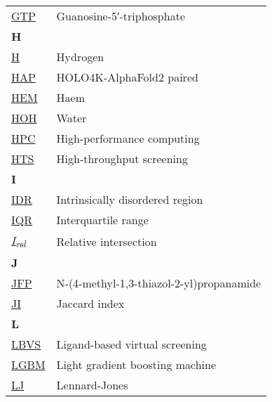 \begin{longtable}[l]{@{}p{2.5cm}p{12cm}@{}}
\textmd{\href{https://www.ebi.ac.uk/pdbe-srv/pdbechem/chemicalCompound/show/GTP}{GTP}} & Guanosine-5′-triphosphate \\[0.3175cm]
\textbf{\large H} & \\[0.25cm]
\textmd{\href{https://en.wikipedia.org/wiki/Hydrogen}{H}} & Hydrogen \\
\textmd{\href{https://jcheminf.biomedcentral.com/articles/10.1186/s13321-024-00821-4}{HAP}} & HOLO4K-AlphaFold2 paired \\
\textmd{\href{https://www.ebi.ac.uk/pdbe-srv/pdbechem/chemicalCompound/show/HEM}{HEM}} & Haem \\
\textmd{\href{https://www.ebi.ac.uk/pdbe-srv/pdbechem/chemicalCompound/show/HOH}{HOH}} & Water \\
\textmd{\href{https://en.wikipedia.org/wiki/High-performance_computing}{HPC}} & High-performance computing \\
\textmd{\href{https://en.wikipedia.org/wiki/High-throughput_screening}{HTS}} & High-throughput screening \\[0.3175cm]
\textbf{\large I} & \\[0.25cm]
\textmd{\href{https://en.wikipedia.org/wiki/Intrinsically_disordered_proteins}{IDR}} & Intrinsically disordered region \\
\textmd{\href{https://en.wikipedia.org/wiki/Interquartile_range}{IQR}} & Interquartile range \\
\textmd{\href{https://www.nature.com/articles/s42003-024-05970-8}{\textit{I\textsubscript{rel}}}} & Relative intersection \\[0.3175cm]
\textbf{\large J} & \\[0.25cm]
\textmd{\href{https://www.ebi.ac.uk/pdbe-srv/pdbechem/chemicalCompound/show/JFP}{JFP}} & N-(4-methyl-1,3-thiazol-2-yl)propanamide \\
\textmd{\href{https://en.wikipedia.org/wiki/Jaccard_index}{JI}} & Jaccard index \\[0.3175cm]
\textbf{\large L} & \\[0.25cm]
\textmd{\href{https://en.wikipedia.org/wiki/Virtual_screening\#Ligand-based_methods_2}{LBVS}} & Ligand-based virtual screening \\
\textmd{\href{https://en.wikipedia.org/wiki/LightGBM}{LGBM}} & Light gradient boosting machine \\
\textmd{\href{https://en.wikipedia.org/wiki/Lennard-Jones_potential}{LJ}} & Lennard-Jones \\[0.3175cm]

\end{longtable}
